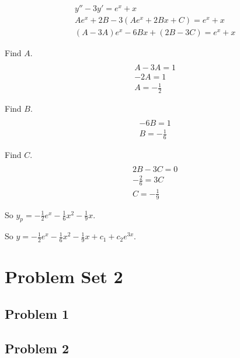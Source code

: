 \documentclass[titlepage]{article}
\begin{document}
\begin{align*}
  &y'' - 3y' = e^x + x
  \\ &Ae^x + 2B - 3(Ae^x + 2Bx + C) = e^x + x
  \\ &(A- 3A)e^x - 6Bx + (2B - 3C) = e^x + x
\end{align*}

Find $A$.
\begin{align*}
  \\ &A - 3A = 1
  \\ &-2A = 1
  \\ &A = -\frac{1}{2}
\end{align*}

Find $B$.
\begin{align*}
  \\ &-6B = 1
  \\ &B = -\frac{1}{6}
\end{align*}

Find $C$.
\begin{align*}
  \\ &2B - 3C = 0
  \\ &-\frac{2}{6} = 3C
  \\ &C = -\frac{1}{9}
\end{align*}


So $y_p = -\frac{1}{2}e^x -\frac{1}{6}x^2 - \frac{1}{9}x$.

So $y = -\frac{1}{2}e^x -\frac{1}{6}x^2 - \frac{1}{9}x + c_1 + c_2e^{3x}$.

\section{Problem Set 2}
\subsection{Problem 1}
\subsection{Problem 2}
\end{document}
